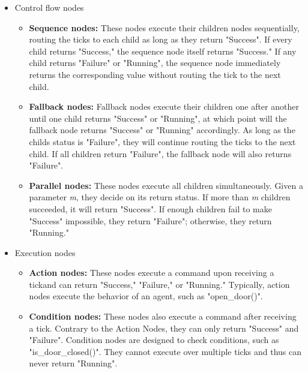 \begin{itemize}
	\item Control flow nodes
	\begin{itemize}
		\item \textbf{Sequence nodes:} These nodes execute their children nodes sequentially, routing the ticks to each child as long as they return "Success".  If every child returns "Success," the sequence node itself returns "Success." If any child returns "Failure" or "Running", the sequence node immediately returns the corresponding value without routing the tick to the next child.
		
		\item \textbf{Fallback nodes:} Fallback nodes execute their children one after another until one child returns "Success" or "Running", at which point will the fallback node returns "Success" or "Running" accordingly. As long as the childs status is "Failure", they will continue routing the ticks to the next child. If all children return "Failure", the fallback node will also returns "Failure".
		
		\item \textbf{Parallel nodes:} These nodes execute all children simultaneously. Given a parameter \textit{m}, they decide on its return status. If more than \textit{m} children succeeded, it will return "Success".  If enough children fail to make "Success" impossible, they return "Failure"; otherwise, they return "Running."
	\end{itemize}
	\item Execution nodes
	\begin{itemize}
		\item \textbf{Action nodes:} These nodes execute a command upon receiving a tickand can return "Success," "Failure," or "Running." Typically, action nodes execute the behavior of an agent, such as "open\_door()".
		
		\item \textbf{Condition nodes:} These nodes also execute a command after receiving a tick. Contrary to the  Action Nodes, they can only return "Success" and "Failure".  Condition nodes are designed to check conditions, such as "is\_door\_closed()". They cannot execute over multiple ticks and thus can never return "Running".
	\end{itemize}
\end{itemize}